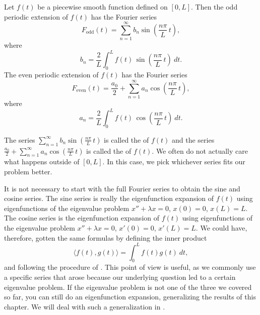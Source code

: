 \documentclass[12pt]{book}
\begin{document}
\begin{theorem}
Let $f(t)$ be a piecewise smooth function defined on $[0,L]$.
Then the odd periodic extension
of $f(t)$ has the Fourier series
\begin{equation*}
\boxed{~~
F_{\text{odd}}(t) = \sum_{n=1}^\infty b_n \sin \left( \frac{n \pi}{L} \, t
\right) ,
~~}
\end{equation*}
where
\begin{equation*}
\boxed{~~
b_n = 
\frac{2}{L} \int_{0}^L f(t)\, \sin \left( \frac{n \pi}{L} \, t \right) ~ dt .
~~}
\end{equation*}
The even periodic extension of $f(t)$ has the Fourier series
\begin{equation*}
\boxed{~~
F_{\text{even}}(t) = \frac{a_0}{2} + \sum_{n=1}^\infty a_n \cos \left(
\frac{n \pi}{L} \, t \right) ,
~~}
\end{equation*}
where
\begin{equation*}
\boxed{~~
a_n = 
\frac{2}{L} \int_{0}^L f(t)\, \cos \left( \frac{n \pi}{L} \, t \right) ~ dt .
~~}
\end{equation*}
\end{theorem}

The series $\sum_{n=1}^\infty b_n \sin \left( \frac{n \pi}{L} \, t\right)$ is called
the \emph{} of $f(t)$ and the series
$\frac{a_0}{2} + \sum_{n=1}^\infty a_n \cos \left( \frac{n \pi}{L} \, t
\right)$
is called the \emph{} of $f(t)$.  
We often do not actually care what happens outside of $[0,L]$.  In this case,
we pick whichever series fits our problem better.

It is not necessary to start with the full Fourier series to obtain
the sine and cosine series.
The sine series is really the eigenfunction expansion of $f(t)$ using 
eigenfunctions of the eigenvalue problem $x''+\lambda x = 0$, $x(0) = 0$,
$x(L) = L$.  The cosine series is the eigenfunction expansion of $f(t)$
using 
eigenfunctions of the eigenvalue problem $x''+\lambda x = 0$, $x'(0) = 0$,
$x'(L) = L$.  We could have, therefore, gotten the same formulas
by defining the inner product
\begin{equation*}
\langle f(t), g(t) \rangle = \int_0^L f(t) g(t) ~ dt ,
\end{equation*}
and following the procedure of .  This point of view is
useful, as we commonly use a specific series that arose because our underlying
question 
led to a certain eigenvalue problem.  If the eigenvalue 
problem is not one of the three we covered so far, you can still do an
eigenfunction expansion, generalizing the results of this chapter.  We will
deal with such a generalization in .
\end{document}
